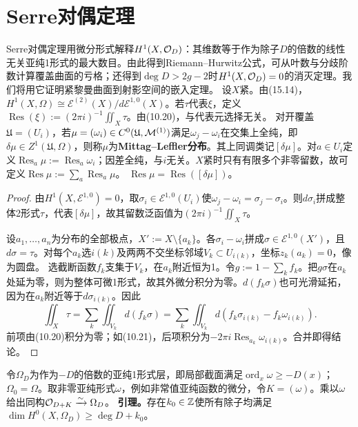 \section{Serre对偶定理}
Serre对偶定理用微分形式解释$H^1(X,\mathcal O_D)$：其维数等于作为除子$D$的倍数的线性无关亚纯1形式的最大数目。由此得到Riemann--Hurwitz公式，可从叶数与分歧阶数计算覆盖曲面的亏格；还得到$\deg D>2g-2$时$H^1(X,\mathcal O_D)=0$的消灭定理。我们将用它证明紧黎曼曲面到射影空间的嵌入定理。
设$X$紧。由(15.14)，$H^1(X,\Omega)\cong\mathcal E^{(2)}(X)/d\mathcal E^{1,0}(X)$。若$\tau$代表$\xi$，定义$\operatorname{Res}(\xi):=(2\pi i)^{-1}\iint_X\tau$。由(10.20)，与代表元选择无关。
对开覆盖$\mathfrak U=(U_i)$，若$\mu=(\omega_i)\in C^0(\mathfrak U,\mathcal M^{(1)})$满足$\omega_j-\omega_i$在交集上全纯，即$\delta\mu\in Z^1(\mathfrak U,\Omega)$，则称$\mu$为\textbf{Mittag--Leffler分布}。其上同调类记$[\delta\mu]$。对$a\in U_i$定义$\operatorname{Res}_a\mu:=\operatorname{Res}_a\omega_i$；因差全纯，与$i$无关。$X$紧时只有有限多个非零留数，故可定义$\operatorname{Res}\mu:=\sum_a\operatorname{Res}_a\mu$。
$\operatorname{Res}\mu=\operatorname{Res}([\delta\mu])$。
\begin{proof}
由$H^1(X,\mathcal E^{1,0})=0$，取$\sigma_i\in\mathcal E^{1,0}(U_i)$使$\omega_j-\omega_i=\sigma_j-\sigma_i$。则$d\sigma_i$拼成整体2形式$\tau$，代表$[\delta\mu]$，故其留数泛函值为$(2\pi i)^{-1}\iint_X\tau$。

设$a_1,\ldots,a_n$为分布的全部极点，$X':=X\setminus\{a_k\}$。各$\sigma_i-\omega_i$拼成$\sigma\in\mathcal E^{1,0}(X')$，且$d\sigma=\tau$。对每个$a_k$选$i(k)$及两两不交坐标邻域$V_k\subset U_{i(k)}$，坐标$z_k(a_k)=0$，像为圆盘。
选截断函数$f_k$支集于$V_k$，在$a_k$附近恒为1。令$g:=1-\sum_kf_k$。把$g\sigma$在$a_k$处延为零，则为整体可微1形式，故其外微分积分为零。$d(f_k\sigma)$也可光滑延拓，因为在$a_k$附近等于$d\sigma_{i(k)}$。因此
\[
\iint_X\tau=\sum_k\iint_{V_k}d(f_k\sigma)
=\sum_k\iint_{V_k}d(f_k\sigma_{i(k)}-f_k\omega_{i(k)}).
\]
前项由(10.20)积分为零；如(10.21)，后项积分为$-2\pi i\operatorname{Res}_{a_k}\omega_{i(k)}$。合并即得结论。
\end{proof}
令$\Omega_D$为作为$-D$的倍数的亚纯1形式层，即局部截面满足$\operatorname{ord}_x\omega\ge-D(x)$；$\Omega_0=\Omega$。取非零亚纯形式$\omega$，例如非常值亚纯函数的微分，令$K=(\omega)$。乘以$\omega$给出同构$\mathcal O_{D+K}\xrightarrow{\sim}\Omega_D$。
\textbf{引理。}存在$k_0\in\mathbb Z$使所有除子均满足$\dim H^0(X,\Omega_D)\ge\deg D+k_0$。
